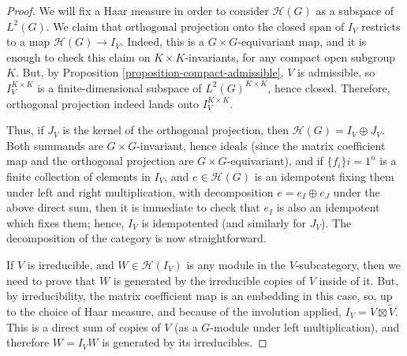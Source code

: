 \begin{proof}
	We will fix a Haar measure in order to consider $\mathcal H(G)$ as a subspace of $L^2(G)$. We claim that orthogonal projection onto the closed span of $I_V$ restricts to a map $\mathcal H(G)\to I_V$. Indeed, this is a $G\times G$-equivariant map, and it is enough to check this claim on $K\times K$-invariants, for any compact open subgroup $K$. But, by Proposition \ref{proposition-compact-admissible}, $V$ is admissible, so $I_V^{K\times K}$ is a finite-dimensional subspace of $L^2(G)^{K\times K}$, hence closed. Therefore, orthogonal projection indeed lands onto $I_V^{K\times K}$. 
	
	Thus, if $J_V$ is the kernel of the orthogonal projection, then $\mathcal H(G)=I_V\oplus J_V$. Both summands are $G\times G$-invariant, hence ideals (since the matrix coefficient map and the orthogonal projection are $G\times G$-equivariant), and if $\{f_i\}{i=1}^n$ is a finite collection of elements in $I_V$, and $e \in \mathcal H(G)$ is an idempotent fixing them under left and right multiplication, with decomposition $e=e_I\oplus e_J$ under the above direct sum, then it is immediate to check that $e_I$ is also an idempotent which fixes them; hence, $I_V$ is idempotented (and similarly for $J_V$). The decomposition of the category is now straightforward.
	
	If $V$ is irreducible, and $W\in \mathcal H(I_V)$ is any module in the $V$-subcategory, then we need to prove that $W$ is generated by the irreducible copies of $V$ inside of it. But, by irreducibility, the matrix coefficient map is an embedding in this case, so, up to the choice of Haar measure, and because of the involution applied, $I_V=V\boxtimes\tilde V$. This is a direct sum of copies of $V$ (as a $G$-module under left multiplication), and therefore $W=I_VW$ is generated by its irreducibles.
\end{proof}


